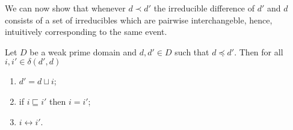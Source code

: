\documentclass[conference]{IEEEtran}
\newcommand{\ir}[1]{\ensuremath{\mathop{\mathit{ir}({#1})}}}
\newcommand{\diff}[2]{\ensuremath{\delta({#1},{#2})}}
\begin{document}
We can now  show that whenever $d \prec d'$ the
irreducible difference of $d'$ and $d$ consists of a set of
irreducibles which are pairwise interchangeble, hence, intuitively corresponding to the same event.

\begin{lemma}
  \label{le:prec-irr-b}
  Let $D$ be a weak prime domain and $d, d' \in D$ such that $d \preceq d'$.
  Then for all $i,i' \in \diff{d'}{d}$ 
  \begin{enumerate}
  \item  
    \label{le:prec-irr-b:1}
    $d' = d \sqcup i$;

  \item  
    \label{le:prec-irr-b:1bis}
    if $i \sqsubseteq i'$ then $i=i'$;


  \item  
    \label{le:prec-irr-b:3}
    $i \leftrightarrow i'$.
  \end{enumerate}
\end{lemma}
\end{document}
